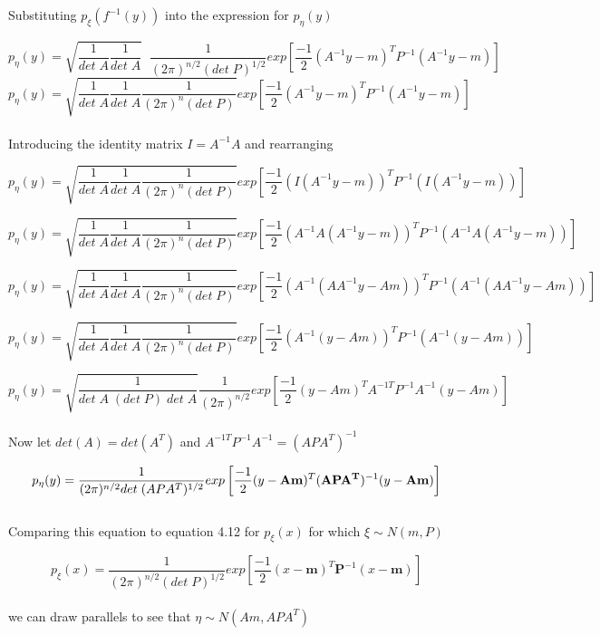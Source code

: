 \documentclass[10pt]{article}
\begin{document}
\noindent
Substituting $p_{\xi}(f^{-1}(y))$ into the expression for $p_\eta(y)$

\[ p_\eta(y)=\sqrt{\frac{1}{det\;A} \frac{1}{det\;A} } \;\; \frac{1}{(2\pi)^{n/2}(det\;P)^{1/2}}exp\left[ \frac{-1}{2}(A^{-1}y-m)^TP^{-1}(A^{-1}y-m) \right]   \]
\[ p_\eta(y)=\sqrt{\frac{1}{det\;A} \frac{1}{det\;A} \frac{1}{(2\pi)^n (det\;P)} } exp\left[ \frac{-1}{2}(A^{-1}y-m)^TP^{-1}(A^{-1}y-m) \right]  \]
\\

\noindent
Introducing the identity matrix $I=A^{-1}A$ and rearranging

\[ p_\eta(y)=\sqrt{\frac{1}{det\;A} \frac{1}{det\;A} \frac{1}{(2\pi)^n (det\;P)} } exp\left[ \frac{-1}{2}(I(A^{-1}y-m))^TP^{-1}(I(A^{-1}y-m)) \right]  \]

\[ p_\eta(y)=\sqrt{\frac{1}{det\;A} \frac{1}{det\;A} \frac{1}{(2\pi)^n (det\;P)} } exp\left[ \frac{-1}{2}(A^{-1}A(A^{-1}y-m))^TP^{-1}(A^{-1}A(A^{-1}y-m)) \right]  \]

\[ p_\eta(y)=\sqrt{\frac{1}{det\;A} \frac{1}{det\;A} \frac{1}{(2\pi)^n (det\;P)} } exp\left[ \frac{-1}{2}(A^{-1}(AA^{-1}y-Am))^TP^{-1}(A^{-1}(AA^{-1}y-Am)) \right]  \]

\[ p_\eta(y)=\sqrt{\frac{1}{det\;A} \frac{1}{det\;A} \frac{1}{(2\pi)^n (det\;P)} } exp\left[ \frac{-1}{2}(A^{-1}(y-Am))^TP^{-1}(A^{-1}(y-Am)) \right]  \]

\[ p_\eta(y)=\sqrt{\frac{1}{det\;A \;(det\;P) \; det\;A } } \frac{1}{(2\pi)^{n/2} }exp\left[ \frac{-1}{2}(y-Am)^T A^{-1T} P^{-1}A^{-1}(y-Am) \right]  \]
\\

\noindent
Now let $det(A)=det(A^T)$ and $A^{-1T} P^{-1}A^{-1}=(APA^T)^{-1}$

\[ p_\eta(y)=\frac{1}{(2\pi)^{n/2}det\;( APA^T)^{1/2}} exp\left[ \frac{-1}{2}(y-{\bf Am})^T ({\bf APA^T} )^{-1}  (y-{\bf Am}) \right]  \]
\\


\noindent
Comparing this equation to equation 4.12 for $p_{\xi}(x)$ for which $\xi \sim N(m,P)$ 

\[ p_{\xi}(x)=\frac{1}{(2\pi)^{n/2}(det\;P)^{1/2}}exp\left[ \frac{-1}{2}(x-\textbf{m})^T \textbf{P}^{-1} (x-\textbf{m}) \right] \]
\\

\noindent
we can draw parallels to see that $\eta \sim N(Am,APA^T)$
\end{document}
